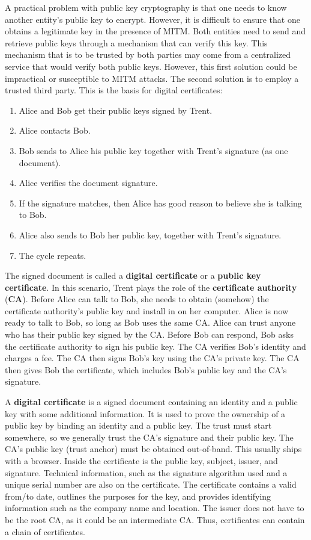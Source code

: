 \documentclass[11pt]{article}
\theoremstyle{plain} %
\theoremstyle{definition}
\theoremstyle{example}
\theoremstyle{remark}
\begin{document}
A practical problem with public key cryptography is that one needs to know another entity's public key to encrypt. However, it is difficult to ensure that one obtains a legitimate key in the presence of MITM. Both entities need to send and retrieve public keys through a mechanism that can verify this key. This mechanism that is to be trusted by both parties may come from a centralized service that would verify both public keys. However, this first solution could be impractical or susceptible to MITM attacks. The second solution is to employ a trusted third party. This is the basis for digital certificates:
\begin{enumerate}
	\item Alice and Bob get their public keys signed by Trent.
	\item Alice contacts Bob.
	\item Bob sends to Alice his public key together with Trent's signature (as one document). 
	\item Alice verifies the document signature.
	\item If the signature matches, then Alice has good reason to believe she is talking to Bob.
	\item Alice also sends to Bob her public key, together with Trent's signature. 
	\item The cycle repeats. 
\end{enumerate}
The signed document is called a \textbf{digital certificate} or a \textbf{public key certificate}. In this scenario, Trent plays the role of the \textbf{certificate authority} (\textbf{CA}). Before Alice can talk to Bob, she needs to obtain (somehow) the certificate authority's public key and install in on her computer. Alice is now ready to talk to Bob, so long as Bob uses the same CA. Alice can trust anyone who has their public key signed by the CA. Before Bob can respond, Bob asks the certificate authority to sign his public key. The CA verifies Bob's identity and charges a fee. The CA then signs Bob's key using the CA's private key. The CA then gives Bob the certificate, which includes Bob's public key and the CA's signature. 

A \textbf{digital certificate} is a signed document containing an identity and a public key with some additional information. It is used to prove the ownership of a public key by binding an identity and a 
public key. The trust must start somewhere, so we generally trust the CA's signature and their public key. The CA's public key (trust anchor) must be obtained out-of-band. This usually ships with a browser. 
Inside the certificate is the public key, subject, issuer, and signature. Technical information, such as the signature algorithm used and a unique serial number are also on the certificate. The certificate contains a valid from/to date, outlines the purposes for the key, and provides identifying information such as the company name and location. The issuer does not have to be the root CA, as it could be an intermediate CA. Thus, certificates can contain a chain of certificates. 
\end{document}
